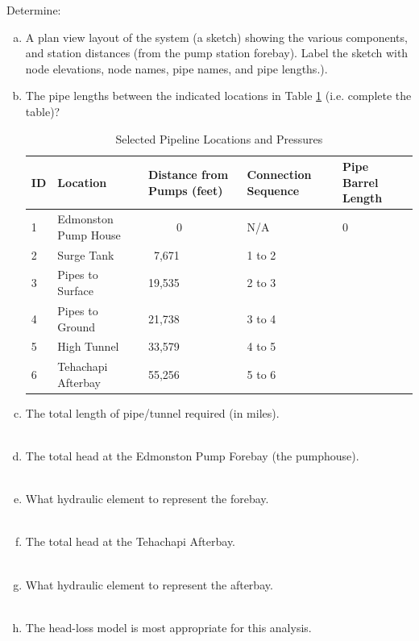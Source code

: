 \documentclass[12pt]{article}
\begin{document}
\begin{enumerate}
\clearpage
Determine:
    \begin{enumerate}[a)]
\item A plan view layout of the system (a sketch) showing the various components, and station distances (from the pump station forebay).  Label the sketch with node elevations, node names, pipe names, and pipe lengths.).
\item The pipe lengths between the indicated locations in Table \ref{tab:lengths} (i.e. complete the table)?
\begin{table}[h!]
   \centering
    \caption{Selected Pipeline Locations and Pressures }
   \begin{tabular}{p{0.5in}p{1.8in}p{1in}p{1in}p{1in}} %
\hline
\hline
ID & Location & Distance from Pumps (feet) & Connection Sequence & Pipe Barrel Length  \\
\hline
\hline
1& Edmonston Pump House & ~~~~~0  & N/A & 0 \\
\hline
2& Surge Tank & ~7,671 & 1 to 2 & ~~ \\
\hline
3& Pipes to Surface & 19,535 & 2 to 3 & ~~ \\
\hline
4& Pipes to Ground & 21,738 & 3 to 4 & ~~ \\
\hline
5& High Tunnel & 33,579 & 4 to 5 & ~~ \\
\hline
6& Tehachapi Afterbay & 55,256 & 5 to 6 & ~~ \\
\hline
   \end{tabular}
   \label{tab:lengths}
\end{table}
\item The total length of pipe/tunnel required (in miles). \\~\\
\item The total head at the Edmonston Pump Forebay (the pumphouse). \\~\\
\item What hydraulic element to represent the forebay. \\~\\
\item The total head at the Tehachapi Afterbay. \\~\\
\item What hydraulic element to represent the afterbay. \\~\\
\item The head-loss model is most appropriate for this analysis. \\~\\

\end{enumerate}
\end{enumerate}
\end{document}
